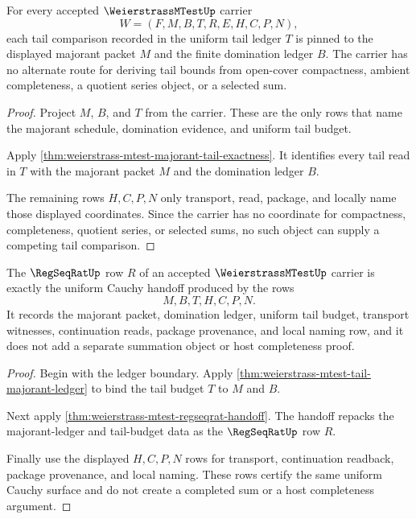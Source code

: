 \begin{theorem}
\label{thm:weierstrass-mtest-tail-majorant-ledger}
For every accepted $\WeierstrassMTestUp$ carrier
$$
W=(F,M,B,T,R,E,H,C,P,N),
$$
each tail comparison recorded in the uniform tail ledger $T$ is pinned to the displayed majorant packet $M$ and the finite domination ledger $B$. The carrier has no alternate route for deriving tail bounds from open-cover compactness, ambient completeness, a quotient series object, or a selected sum.
\end{theorem}
\begin{proof}
Project $M$, $B$, and $T$ from the carrier. These are the only rows that name the majorant schedule, domination evidence, and uniform tail budget.

Apply \autoref{thm:weierstrass-mtest-majorant-tail-exactness}. It identifies every tail read in $T$ with the majorant packet $M$ and the domination ledger $B$.

The remaining rows $H,C,P,N$ only transport, read, package, and locally name those displayed coordinates. Since the carrier has no coordinate for compactness, completeness, quotient series, or selected sums, no such object can supply a competing tail comparison.
\end{proof}

\begin{theorem}
\label{thm:weierstrass-mtest-uniform-cauchy-handoff}
The $\RegSeqRatUp$ row $R$ of an accepted $\WeierstrassMTestUp$ carrier is exactly the uniform Cauchy handoff produced by the rows
$$
M,B,T,H,C,P,N.
$$
It records the majorant packet, domination ledger, uniform tail budget, transport witnesses, continuation reads, package provenance, and local naming row, and it does not add a separate summation object or host completeness proof.
\end{theorem}
\begin{proof}
Begin with the ledger boundary. Apply \autoref{thm:weierstrass-mtest-tail-majorant-ledger} to bind the tail budget $T$ to $M$ and $B$.

Next apply \autoref{thm:weierstrass-mtest-regseqrat-handoff}. The handoff repacks the majorant-ledger and tail-budget data as the $\RegSeqRatUp$ row $R$.

Finally use the displayed $H,C,P,N$ rows for transport, continuation readback, package provenance, and local naming. These rows certify the same uniform Cauchy surface and do not create a completed sum or a host completeness argument.
\end{proof}

